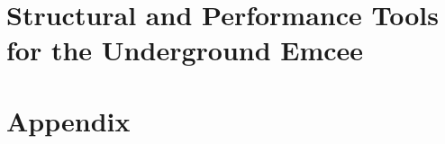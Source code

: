 \documentclass[12pt]{report}
\begin{document}
\chapter{Structural and Performance Tools for the Underground Emcee}



\singlespacing
\printbibliography
{}
\nocite{*}

\chapter*{Appendix}

\end{document}
